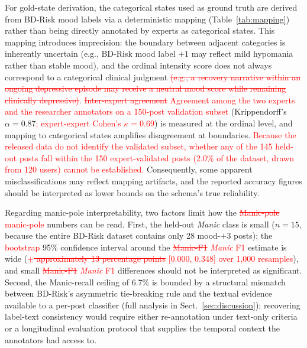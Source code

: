 \documentclass[runningheads]{llncs}
\newcommand{\rev}[1]{\textcolor{red}{#1}}
\newcommand{\del}[1]{\textcolor{red}{\sout{#1}}}
\newcommand{\rev}[1]{#1}
\newcommand{\del}[1]{}
\begin{document}
For gold-state derivation, the categorical states used as ground truth are derived from BD-Risk mood labels via a deterministic mapping (Table~\ref{tab:mapping}) rather than being directly annotated by experts as categorical states. This mapping introduces imprecision: the boundary between adjacent categories is inherently uncertain (e.g., BD-Risk mood label $+1$ may reflect mild hypomania rather than stable mood), and the ordinal intensity score does not always correspond to a categorical clinical judgment\del{ (e.g., a recovery narrative within an ongoing depressive episode may receive a neutral mood score while remaining clinically depressive)}. \del{Inter-expert agreement} \rev{Agreement among the two experts and the researcher annotators on a 150-post validation subset} (Krippendorff's $\alpha = 0.87$\rev{; expert-expert Cohen's $\kappa = 0.69$}) is measured at the ordinal level, and mapping to categorical states amplifies disagreement at boundaries. \rev{Because the released data do not identify the validated subset, whether any of the 145 held-out posts fall within the 150 expert-validated posts (2.0\% of the dataset, drawn from 120 users) cannot be established.} Consequently, some apparent misclassifications may reflect mapping artifacts, and the reported accuracy figures should be interpreted as lower bounds on the schema's true reliability.

Regarding manic-pole interpretability, two factors limit how the \del{Manic-pole} \rev{manic-pole} numbers can be read. First, the held-out \emph{Manic} class is small ($n=15$, because the entire BD-Risk dataset contains only 28 mood-$+3$ posts); the \rev{bootstrap} 95\% confidence interval around the \del{Manic-F1} \rev{\emph{Manic} F1} estimate is wide (\del{$\pm$ approximately 13 percentage points }\rev{[0.000, 0.348] over 1{,}000 resamples}), and small \del{Manic-F1} \rev{\emph{Manic} F1} differences should not be interpreted as significant. Second, the Manic-recall ceiling of 6.7\% is bounded by a structural mismatch between BD-Risk's asymmetric tie-breaking rule and the textual evidence available to a per-post classifier (full analysis in Sect.~\ref{sec:discussion}); recovering label-text consistency would require either re-annotation under text-only criteria or a longitudinal evaluation protocol that supplies the temporal context the annotators had access to.
\end{document}
